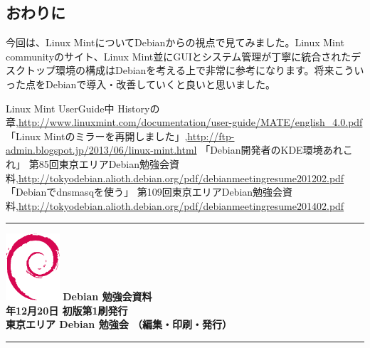 \documentclass[mingoth,a4paper]{jsarticle}
\newcommand{\debmtgyear}{2014}
\newcommand{\debmtgmonth}{12}
\newcommand{\debmtgdate}{20}
\begin{document}
\subsection{おわりに}

 今回は、Linux MintについてDebianからの視点で見てみました。Linux Mint communityのサイト、Linux Mint並にGUIとシステム管理が丁寧に統合されたデスクトップ環境の構成はDebianを考える上で非常に参考になります。将来こういった点をDebianで導入・改善していくと良いと思いました。

\begin{thebibliography}{9}
 Linux Mint UserGuide中 Historyの章,\url{http://www.linuxmint.com/documentation/user-guide/MATE/english_4.0.pdf}
 「Linux Mintのミラーを再開しました」,\url{http://ftp-admin.blogspot.jp/2013/06/linux-mint.html}
「Debian開発者のKDE環境あれこれ」 第85回東京エリアDebian勉強会資料,\url{http://tokyodebian.alioth.debian.org/pdf/debianmeetingresume201202.pdf}
  「Debianでdnsmasqを使う」 第109回東京エリアDebian勉強会資料,\url{http://tokyodebian.alioth.debian.org/pdf/debianmeetingresume201402.pdf}
\end{thebibliography}
 
\newpage

\vspace*{15cm}
\hrule
\vspace{2mm}
\includegraphics[width=2cm]{image200502/openlogo-nd.eps}
\noindent \Large \bf Debian 勉強会資料\\
\noindent \normalfont \debmtgyear{}年\debmtgmonth{}月\debmtgdate{}日 \hspace{5mm}  初版第1刷発行\\
\noindent \normalfont 東京エリア Debian 勉強会 （編集・印刷・発行）\\
\hrule
\end{document}
